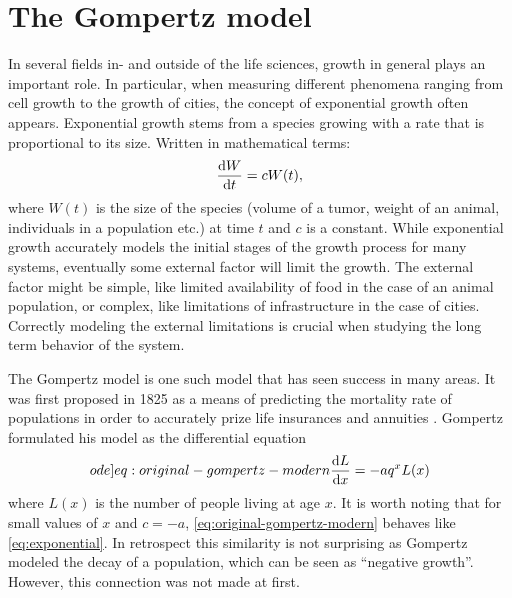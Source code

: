 \section{The Gompertz model}

In several fields in- and outside of the life sciences, growth in general plays an important role.
In particular, when measuring different phenomena ranging from cell growth to the growth of cities, the concept of exponential growth often appears.
Exponential growth stems from a species growing with a rate that is proportional to its size.
Written in mathematical terms:
\begin{equation} \label{eq:exponential}
  \diff{W}{t} = c W(t),
\end{equation}
where \(W(t)\) is the size of the species (volume of a tumor, weight of an animal, individuals in a population etc.) at time \(t\) and \(c\) is a constant.
While exponential growth accurately models the initial stages of the growth process for many systems, eventually some external factor will limit the growth.
The external factor might be simple, like limited availability of food in the case of an animal population, or complex, like limitations of infrastructure in the case of cities.
Correctly modeling the external limitations is crucial when studying the long term behavior of the system.

The Gompertz model is one such model that has seen success in many areas.
It was first proposed in 1825 as a means of predicting the mortality rate of populations in order to accurately prize life insurances and annuities \cite{gompertz1825nature}.
Gompertz formulated his model as the differential equation
\begin{equation} \label[ode]{eq:original-gompertz-modern}
  \diff{L}{x} = -a q^x L(x)
\end{equation}
where \(L(x)\) is the number of people living at age \(x\).
It is worth noting that for small values of \(x\) and \(c = -a\), \cref{eq:original-gompertz-modern} behaves like \cref{eq:exponential}.
In retrospect this similarity is not surprising as Gompertz modeled the decay of a population, which can be seen as \enquote{negative growth}.
However, this connection was not made at first.

